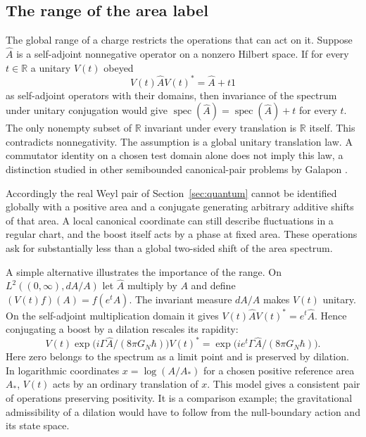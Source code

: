 \documentclass[11pt,letterpaper]{article}
\newcommand{\RR}{\mathbb R}
\begin{document}
\subsection{The range of the area label}
The global range of a charge restricts the operations that can act on it. Suppose $\widehat A$
is a self-adjoint nonnegative operator on a nonzero Hilbert space. If for every $t\in\RR$ a
unitary $V(t)$ obeyed
\[
 V(t)\widehat A V(t)^*=\widehat A+t1
\]
as self-adjoint operators with their domains, then invariance of the spectrum under unitary
conjugation would give $\operatorname{spec}(\widehat A)=\operatorname{spec}(\widehat A)+t$ for
every $t$. The only nonempty subset of $\RR$ invariant under every translation is $\RR$ itself.
This contradicts nonnegativity. The assumption is a global unitary translation law. A
commutator identity on a chosen test domain alone does not imply this law, a distinction
studied in other semibounded canonical-pair problems by Galapon \cite{galapon}.

Accordingly the real Weyl pair of Section~\ref{sec:quantum} cannot be identified globally with
a positive area and a conjugate generating arbitrary additive shifts of that area. A local
canonical coordinate can still describe fluctuations in a regular chart, and the boost itself
acts by a phase at fixed area. These operations ask for substantially less than a global
two-sided shift of the area spectrum.

A simple alternative illustrates the importance of the range. On $L^2((0,\infty),dA/A)$ let
$\widehat A$ multiply by $A$ and define $(V(t)f)(A)=f(e^tA)$. The invariant measure $dA/A$
makes $V(t)$ unitary. On the self-adjoint multiplication domain it gives $V(t)\widehat A
V(t)^*=e^t\widehat A$. Hence conjugating a boost by a dilation rescales its rapidity:
\[
 V(t)\exp\bigl(i\Gamma\widehat A/(8\pi G_N\hbar)\bigr)V(t)^*
    =\exp\bigl(i e^t\Gamma\widehat A/(8\pi G_N\hbar)\bigr).
\]
Here zero belongs to the spectrum as a limit point and is preserved by dilation. In logarithmic
coordinates $x=\log(A/A_*)$ for a chosen positive reference area $A_*$, $V(t)$ acts by an
ordinary translation of $x$. This model gives a consistent pair of operations preserving
positivity. It is a comparison example; the gravitational admissibility of a dilation would
have to follow from the null-boundary action and its state space.
\end{document}
